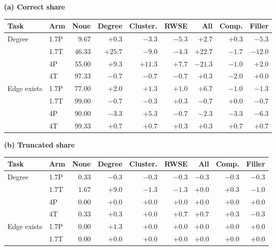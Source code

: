 \begin{table}[t]
\centering\scriptsize
\setlength{\tabcolsep}{3.4pt}
\textbf{(a) Correct share}\par\smallskip
\begin{tabular}{llrrrrrrr}
\toprule
Task & Arm & None & Degree & Cluster. & RWSE & All & Comp. & Filler\\
\midrule
Degree & 1.7P & 9.67 & $+0.3$ & $-3.3$ & $-5.3$ & $+2.7$ & $+0.3$ & $-5.3$\\ %
 & 1.7T & 46.33 & $+25.7$ & $-9.0$ & $-4.3$ & $+22.7$ & $-1.7$ & $-12.0$\\ %
 & 4P & 55.00 & $+9.3$ & $+11.3$ & $+7.7$ & $-21.3$ & $-1.0$ & $+2.0$\\ %
 & 4T & 97.33 & $-0.7$ & $-0.7$ & $-0.7$ & $+0.3$ & $-2.0$ & $+0.0$\\ %
\addlinespace[3pt]
Edge exists & 1.7P & 77.00 & $+2.0$ & $+1.3$ & $+1.0$ & $+6.7$ & $-1.0$ & $-1.3$\\ %
 & 1.7T & 99.00 & $-0.7$ & $-0.3$ & $+0.3$ & $-0.7$ & $+0.0$ & $-0.7$\\ %
 & 4P & 90.00 & $-3.3$ & $+5.3$ & $-0.7$ & $-2.3$ & $-3.3$ & $-6.3$\\ %
 & 4T & 99.33 & $+0.7$ & $+0.7$ & $+0.3$ & $+0.3$ & $+0.7$ & $+0.7$\\ %
\bottomrule
\end{tabular}
\par\medskip
\textbf{(b) Truncated share}\par\smallskip
\begin{tabular}{llrrrrrrr}
\toprule
Task & Arm & None & Degree & Cluster. & RWSE & All & Comp. & Filler\\
\midrule
Degree & 1.7P & 0.33 & $-0.3$ & $-0.3$ & $-0.3$ & $-0.3$ & $-0.3$ & $-0.3$\\ %
 & 1.7T & 1.67 & $+9.0$ & $-1.3$ & $-1.3$ & $+0.0$ & $+0.3$ & $-1.0$\\ %
 & 4P & 0.00 & $+0.0$ & $+0.0$ & $+0.0$ & $+0.0$ & $+0.0$ & $+0.0$\\ %
 & 4T & 0.33 & $+0.3$ & $+0.0$ & $+0.7$ & $+0.7$ & $+0.3$ & $-0.3$\\ %
\addlinespace[3pt]
Edge exists & 1.7P & 0.00 & $+1.3$ & $+0.0$ & $+0.0$ & $+0.0$ & $+0.0$ & $+0.0$\\ %
 & 1.7T & 0.00 & $+0.0$ & $+0.0$ & $+0.0$ & $+0.0$ & $+0.0$ & $+0.0$\\ %

\end{tabular}
\end{table}
